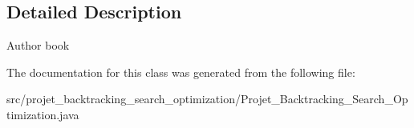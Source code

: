 \subsection{Detailed Description}
\begin{DoxyAuthor}{Author}
book 
\end{DoxyAuthor}


The documentation for this class was generated from the following file\+:\begin{DoxyCompactItemize}
\item 
src/projet\+\_\+backtracking\+\_\+search\+\_\+optimization/Projet\+\_\+\+Backtracking\+\_\+\+Search\+\_\+\+Optimization.\+java\end{DoxyCompactItemize}
